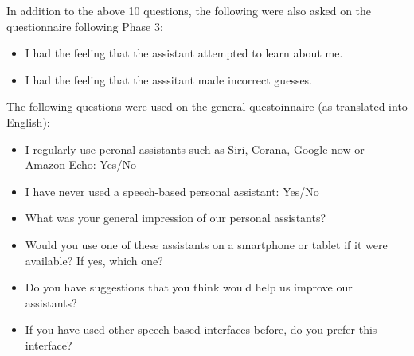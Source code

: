 \documentclass[11pt]{article}
\begin{document}
In addition to the above 10 questions, the following were also asked on the questionnaire following Phase 3:
\begin{itemize}
 \item I had the feeling that the assistant attempted to learn about me.
 \item I had the feeling that the asssitant made incorrect guesses. 
\end{itemize}


The following questions were used on the general questoinnaire (as translated into English):
\begin{itemize}
 \item I regularly use peronal assistants such as Siri, Corana, Google now or Amazon Echo: Yes/No
 \item I have never used a speech-based personal assistant: Yes/No
 \item What was your general impression of our personal assistants?
 \item Would you use one of these assistants on a smartphone or tablet if it were available? If yes, which one?
 \item Do you have suggestions that you think would help us improve our assistants?
 \item If you have used other speech-based interfaces before, do you prefer this interface?
\end{itemize}




\end{document}
